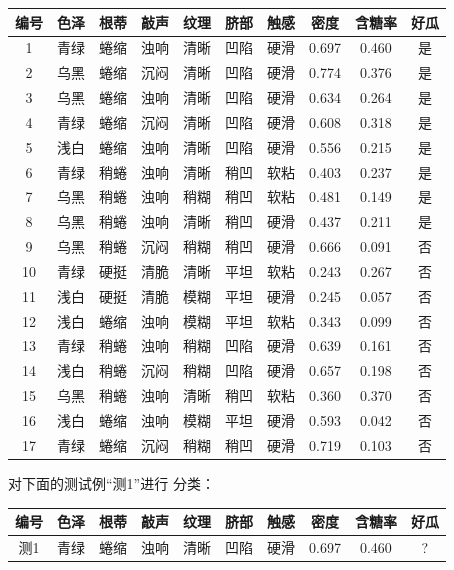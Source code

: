 \begin{table}[h]
	\centering
	\begin{tabular}{|c|c|c|c|c|c|c|c|c|c|}\hline
		编号 & 色泽 & 根蒂 & 敲声 & 纹理 & 脐部 & 触感 & 密度  & 含糖率 & 好瓜 \\\hline
		1   & 青绿 & 蜷缩 & 浊响 & 清晰 & 凹陷 & 硬滑 & 0.697 & 0.460  &  是 \\\hline
		2   & 乌黑 & 蜷缩 & 沉闷 & 清晰 & 凹陷 & 硬滑 & 0.774 & 0.376  &  是 \\\hline
		3   & 乌黑 & 蜷缩 & 浊响 & 清晰 & 凹陷 & 硬滑 & 0.634 & 0.264  &  是 \\\hline
		4   & 青绿 & 蜷缩 & 沉闷 & 清晰 & 凹陷 & 硬滑 & 0.608 & 0.318  &  是 \\\hline
		5   & 浅白 & 蜷缩 & 浊响 & 清晰 & 凹陷 & 硬滑 & 0.556 & 0.215  &  是 \\\hline
		6   & 青绿 & 稍蜷 & 浊响 & 清晰 & 稍凹 & 软粘 & 0.403 & 0.237  &  是 \\\hline
		7   & 乌黑 & 稍蜷 & 浊响 & 稍糊 & 稍凹 & 软粘 & 0.481 & 0.149  &  是 \\\hline
		8   & 乌黑 & 稍蜷 & 浊响 & 清晰 & 稍凹 & 硬滑 & 0.437 & 0.211  &  是 \\\hline
		9   & 乌黑 & 稍蜷 & 沉闷 & 稍糊 & 稍凹 & 硬滑 & 0.666 & 0.091  &  否 \\\hline
		10  & 青绿 & 硬挺 & 清脆 & 清晰 & 平坦 & 软粘 & 0.243 & 0.267  &  否 \\\hline
		11  & 浅白 & 硬挺 & 清脆 & 模糊 & 平坦 & 硬滑 & 0.245 & 0.057  &  否 \\\hline
		12  & 浅白 & 蜷缩 & 浊响 & 模糊 & 平坦 & 软粘 & 0.343 & 0.099  &  否 \\\hline
		13  & 青绿 & 稍蜷 & 浊响 & 稍糊 & 凹陷 & 硬滑 & 0.639 & 0.161  &  否 \\\hline
		14  & 浅白 & 稍蜷 & 沉闷 & 稍糊 & 凹陷 & 硬滑 & 0.657 & 0.198  &  否 \\\hline
		15  & 乌黑 & 稍蜷 & 浊响 & 清晰 & 稍凹 & 软粘 & 0.360 & 0.370  &  否 \\\hline
		16  & 浅白 & 蜷缩 & 浊响 & 模糊 & 平坦 & 硬滑 & 0.593 & 0.042  &  否 \\\hline
		17  & 青绿 & 蜷缩 & 沉闷 & 稍糊 & 稍凹 & 硬滑 & 0.719 & 0.103  &  否 \\\hline
	\end{tabular}
\end{table}


对下面的测试例``测1''进行 分类：

\begin{table}[h]
	\centering
	\begin{tabular}{|c|c|c|c|c|c|c|c|c|c|}\hline
 编号 & 色泽 & 根蒂 & 敲声 & 纹理 & 脐部 & 触感 & 密度  & 含糖率 & 好瓜\\\hline
 测1  & 青绿 & 蜷缩 & 浊响 & 清晰 & 凹陷 & 硬滑 & 0.697 & 0.460  &  ?  \\\hline
	\end{tabular}
\end{table}

